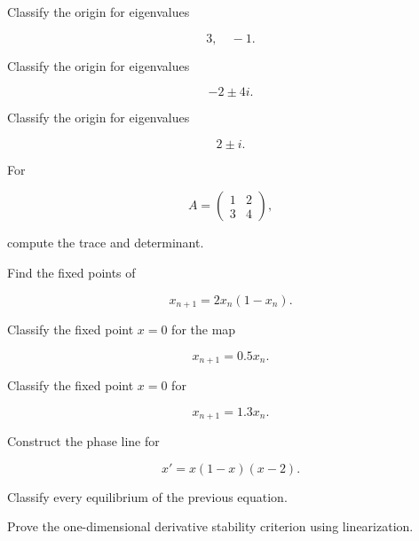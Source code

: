 \begin{exercise}[2]
Classify the origin for eigenvalues

\[
3,
\quad
-1.
\]
\end{exercise}

\begin{exercise}[2]
Classify the origin for eigenvalues

\[
-2\pm4i.
\]
\end{exercise}

\begin{exercise}[2]
Classify the origin for eigenvalues

\[
2\pm i.
\]
\end{exercise}

\begin{exercise}[2]
For

\[
A
=
\begin{pmatrix}
1&2\\
3&4
\end{pmatrix},
\]

compute the trace and determinant.
\end{exercise}

\begin{exercise}[2]
Find the fixed points of

\[
x_{n+1}
=
2x_n(1-x_n).
\]
\end{exercise}

\begin{exercise}[2]
Classify the fixed point \(x=0\) for the map

\[
x_{n+1}
=
0.5x_n.
\]
\end{exercise}

\begin{exercise}[2]
Classify the fixed point \(x=0\) for

\[
x_{n+1}
=
1.3x_n.
\]
\end{exercise}

\begin{exercise}[3]
Construct the phase line for

\[
x'
=
x(1-x)(x-2).
\]
\end{exercise}

\begin{exercise}[3]
Classify every equilibrium of the previous equation.
\end{exercise}

\begin{exercise}[3]
Prove the one-dimensional derivative stability criterion using
linearization.
\end{exercise}

